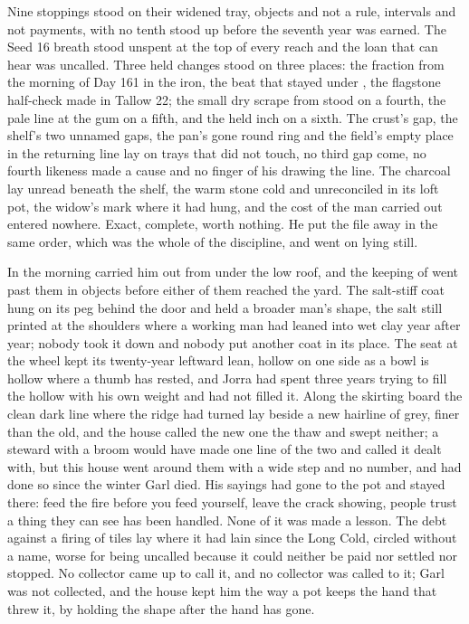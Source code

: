 Nine stoppings stood on their widened tray, objects and not a rule, intervals and not payments, with no tenth stood up before the seventh year was earned. The Seed 16 breath stood unspent at the top of every reach and the loan that can hear was uncalled. Three held changes stood on three places: the fraction from the morning of Day 161 in the iron, the beat that stayed under , the flagstone half-check made in Tallow 22; the small dry scrape from  stood on a fourth, the pale line at the gum on a fifth, and the held inch on a sixth. The crust's gap, the shelf's two unnamed gaps, the pan's gone round ring and the field's empty place in the returning line lay on trays that did not touch, no third gap come, no fourth likeness made a cause and no finger of his drawing the line. The charcoal lay unread beneath the shelf, the warm stone cold and unreconciled in its loft pot, the widow's mark where it had hung, and the cost of the man carried out entered nowhere. Exact, complete, worth nothing. He put the file away in the same order, which was the whole of the discipline, and went on lying still.

\scenebreak

In the morning  carried him out from under the low roof, and the keeping of  went past them in objects before either of them reached the yard. The salt-stiff coat hung on its peg behind the door and held a broader man's shape, the salt still printed at the shoulders where a working man had leaned into wet clay year after year; nobody took it down and nobody put another coat in its place. The seat at the wheel kept its twenty-year leftward lean, hollow on one side as a bowl is hollow where a thumb has rested, and Jorra had spent three years trying to fill the hollow with his own weight and had not filled it. Along the skirting board the clean dark line where the  ridge had turned lay beside a new hairline of grey, finer than the old, and the house called the new one the thaw and swept neither; a steward with a broom would have made one line of the two and called it dealt with, but this house went around them with a wide step and no number, and had done so since the winter Garl died. His sayings had gone to the pot and stayed there: feed the fire before you feed yourself, leave the crack showing, people trust a thing they can see has been handled. None of it was made a lesson. The debt against a firing of tiles lay where it had lain since the Long Cold, circled without a name, worse for being uncalled because it could neither be paid nor settled nor stopped. No collector came up  to call it, and no collector was called to it; Garl was not collected, and the house kept him the way a pot keeps the hand that threw it, by holding the shape after the hand has gone.

